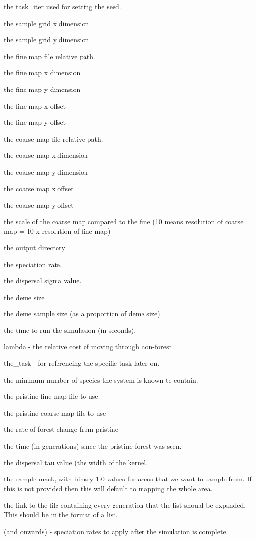 \begin{DoxyEnumerate}
\item the task\+\_\+iter used for setting the seed.
\item the sample grid x dimension
\item the sample grid y dimension
\item the fine map file relative path.
\item the fine map x dimension
\item the fine map y dimension
\item the fine map x offset
\item the fine map y offset
\item the coarse map file relative path.
\item the coarse map x dimension
\item the coarse map y dimension
\item the coarse map x offset
\item the coarse map y offset
\item the scale of the coarse map compared to the fine (10 means resolution of coarse map = 10 x resolution of fine map)
\item the output directory
\item the speciation rate.
\item the dispersal sigma value.
\item the deme size
\item the deme sample size (as a proportion of deme size)
\item the time to run the simulation (in seconds).
\item lambda -\/ the relative cost of moving through non-\/forest
\item the\+\_\+task -\/ for referencing the specific task later on.
\item the minimum number of species the system is known to contain.
\item the pristine fine map file to use
\item the pristine coarse map file to use
\item the rate of forest change from pristine
\item the time (in generations) since the pristine forest was seen.
\item the dispersal tau value (the width of the kernel.
\item the sample mask, with binary 1\+:0 values for areas that we want to sample from. If this is not provided then this will default to mapping the whole area.
\item the link to the file containing every generation that the list should be expanded. This should be in the format of a list.
\item (and onwards) -\/ speciation rates to apply after the simulation is complete.
\end{DoxyEnumerate}

